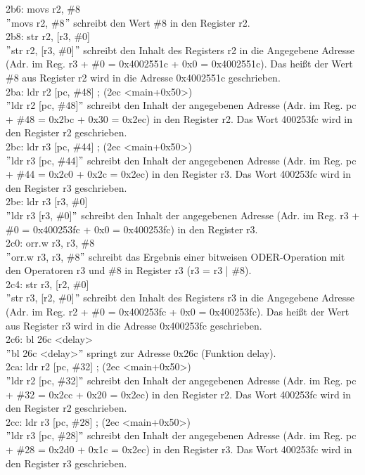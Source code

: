 2b6: movs r2, \#8\\
$"$movs r2, \#8$"$ schreibt den Wert \#8 in den Register r2.\\
2b8: str r2, [r3, \#0]\\
$"$str r2, [r3, \#0]$"$ schreibt den Inhalt des Registers r2 in die Angegebene Adresse (Adr. im Reg. r3 + \#0 = 0x4002551c + 0x0 = 0x4002551c). Das hei\ss{}t der Wert \#8 aus Register r2 wird in die Adresse 0x4002551c geschrieben.\\
2ba: ldr r2 [pc, \#48] ; (2ec <main+0x50>)\\
$"$ldr r2 [pc, \#48]$"$ schreibt den Inhalt der angegebenen Adresse (Adr. im Reg. pc + \#48 = 0x2bc + 0x30 = 0x2ec) in den Register r2. Das Wort 400253fc wird in den Register r2 geschrieben.\\
2bc: ldr r3 [pc, \#44] ; (2ec <main+0x50>)\\
$"$ldr r3 [pc, \#44]$"$ schreibt den Inhalt der angegebenen Adresse (Adr. im Reg. pc + \#44 = 0x2c0 + 0x2c = 0x2ec) in den Register r3. Das Wort 400253fc wird in den Register r3 geschrieben.\\
2be: ldr r3 [r3, \#0]\\
$"$ldr r3 [r3, \#0]$"$ schreibt den Inhalt der angegebenen Adresse (Adr. im Reg. r3 + \#0 = 0x400253fc + 0x0 = 0x400253fc) in den Register r3.\\
2c0: orr.w r3, r3, \#8\\
$"$orr.w r3, r3, \#8$"$ schreibt das Ergebnis einer bitweisen ODER-Operation mit den Operatoren r3 und \#8 in Register r3 (r3 = r3 | \#8).\\
2c4: str r3, [r2, \#0]\\
$"$str r3, [r2, \#0]$"$ schreibt den Inhalt des Registers r3 in die Angegebene Adresse (Adr. im Reg. r2 + \#0 = 0x400253fc + 0x0 = 0x400253fc). Das hei\ss{}t der Wert aus Register r3 wird in die Adresse 0x400253fc geschrieben.\\
2c6: bl 26c <delay>\\
$"$bl 26c <delay>$"$ springt zur Adresse 0x26c (Funktion delay).\\
2ca: ldr r2 [pc, \#32] ; (2ec <main+0x50>)\\
$"$ldr r2 [pc, \#32]$"$ schreibt den Inhalt der angegebenen Adresse (Adr. im Reg. pc + \#32 = 0x2cc + 0x20 = 0x2ec) in den Register r2. Das Wort 400253fc wird in den Register r2 geschrieben.\\
2cc: ldr r3 [pc, \#28] ; (2ec <main+0x50>)\\
$"$ldr r3 [pc, \#28]$"$ schreibt den Inhalt der angegebenen Adresse (Adr. im Reg. pc + \#28 = 0x2d0 + 0x1c = 0x2ec) in den Register r3. Das Wort 400253fc wird in den Register r3 geschrieben.\\
